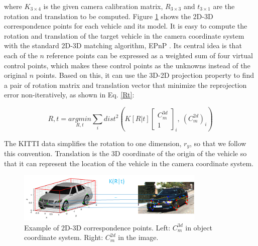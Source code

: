 \documentclass[a4paper,12pt]{article}
\begin{document}
where $K_{3\times 4}$ is the given camera calibration matrix, $R_{3\times 3}$ and $t_{3\times 1}$ are the rotation and translation to be computed. Figure \ref{figure:corresp} shows the 2D-3D correspondence points for each vehicle and its model. It is easy to compute the rotation and translation of the target vehicle in the camera coordinate system with the standard 2D-3D matching algorithm, \ie EPnP \cite{Lepetit2008}. Its central idea is that each of the $n$ reference points can be expressed as a weighted sum of four virtual control points, which makes these control points as the unknowns instead of the original $n$ points. Based on this, it can use the 3D-2D projection property to find a pair of rotation matrix and translation vector that minimize the reprojection error non-iteratively, as shown in Eq. \ref{Rt}:

\begin{equation}
\label{Rt}
	R, t = \underset{R,t}{argmin}\sum_i dist^2(K[R|t]\begin{bmatrix} C_m^{3d} \\1  \end{bmatrix}_i, ~ (C_m^{2d})_i)
\end{equation}

The KITTI data simplifies the rotation to one dimension, $r_y$, so that we follow this convention. Translation is the 3D coordinate of the origin of the vehicle so that it can represent the location of the vehicle in the camera coordinate system.

\begin{figure}[H]		
	\includegraphics[width=0.8\textwidth]{corresp.png}
	\caption[Example of 2D-3D correspondence points.]{Example of 2D-3D correspondence points. Left: $C_m^{3d}$ in object coordinate system. Right: $C_m^{2d}$ in the image.}
	\centering
	\label{figure:corresp}
\end{figure}
\end{document}
